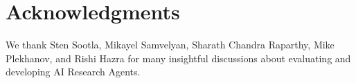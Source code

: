 





\section{Acknowledgments}
\label{sec:ack}
We thank Sten Sootla, Mikayel Samvelyan, Sharath Chandra Raparthy, Mike Plekhanov, and Rishi Hazra for many insightful discussions about evaluating and developing AI Research Agents.
